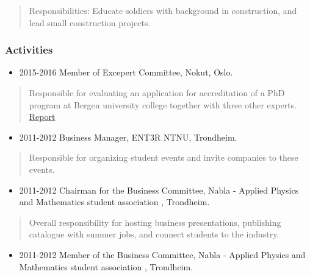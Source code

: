 \documentclass[11pt, a4paper]{article}
\providecommand{\tightlist}{%
  \setlength{\itemsep}{0pt}\setlength{\parskip}{0pt}}
\begin{document}
\begin{raggedright}
\begin{quote}
Responsibilities: Educate soldiers with background in construction, and
lead small construction projects.
\end{quote}

\hypertarget{activities}{%
\subsubsection{Activities}\label{activities}}

\begin{itemize}
\tightlist
\item
  2015-2016 Member of Excepert Committee, Nokut, Oslo.
\end{itemize}

\begin{quote}
Responsible for evaluating an application for accreditation of a PhD
program at Bergen university college together with three other experts.
\href{https://www.nokut.no/contentassets/8709159cefe84f72b68ea2f251f6130a/computer_science_software_engineering_sensor_networks_and_engineering_computing_phd_hib_2016.pdf}{Report}
\end{quote}

\begin{itemize}
\tightlist
\item
  2011-2012 Business Manager, ENT3R NTNU, Trondheim.
\end{itemize}

\begin{quote}
Responsible for organizing student events and invite companies to these
events.
\end{quote}

\begin{itemize}
\tightlist
\item
  2011-2012 Chairman for the Business Committee, Nabla - Applied Physics
  and Mathematics student association , Trondheim.
\end{itemize}

\begin{quote}
Overall responsibility for hosting business presentations, publishing
catalogue with summer jobs, and connect students to the industry.
\end{quote}

\begin{itemize}
\tightlist
\item
  2011-2012 Member of the Business Committee, Nabla - Applied Physics
  and Mathematics student association , Trondheim.
\end{itemize}


\end{raggedright}
\end{document}
